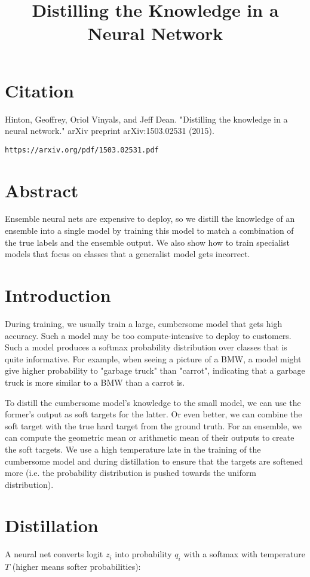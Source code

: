 \documentclass[a4paper]{article}
\title{Distilling the Knowledge in a Neural Network}
\date{}
\begin{document}
\maketitle

\section{Citation}
Hinton, Geoffrey, Oriol Vinyals, and Jeff Dean. "Distilling the knowledge in a neural network." arXiv preprint arXiv:1503.02531 (2015).

\begin{verbatim}
https://arxiv.org/pdf/1503.02531.pdf
\end{verbatim}

\section{Abstract}
Ensemble neural nets are expensive to deploy, so we distill the knowledge of an
ensemble into a single model by training this model to match a combination of
the true labels and the ensemble output. We also show how to train specialist
models that focus on classes that a generalist model gets incorrect.

\section{Introduction}
During training, we usually train a large, cumbersome model that gets high
accuracy. Such a model may be too compute-intensive to deploy to customers.
Such a model produces a softmax probability distribution over classes that is
quite informative. For example, when seeing a picture of a BMW, a model might
give higher probability to "garbage truck" than "carrot", indicating that
a garbage truck is more similar to a BMW than a carrot is.

To distill the cumbersome model's knowledge to the small model, we can use
the former's output as soft targets for the latter. Or even better, we can
combine the soft target with the true hard target from the ground truth. For
an ensemble, we can compute the geometric mean or arithmetic mean of their
outputs to create the soft targets. We use a high temperature late in the
training of the cumbersome model and during distillation to ensure that
the targets are softened more (i.e. the probability distribution is pushed
towards the uniform distribution).

\section{Distillation}
A neural net converts logit $z_i$ into probability $q_i$ with a softmax with
temperature $T$ (higher means softer probabilities):
\end{document}
